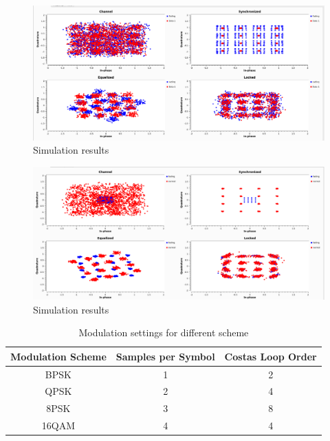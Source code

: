 \begin{figure}
	\includegraphics[width=\linewidth]{./figures/screenshots/QAM16_Fading_2.png}
	\caption{Simulation results}
	\label{fig:simul16QAM}	
\end{figure}

\begin{figure}
	\includegraphics[width=\linewidth]{./figures/screenshots/QAM16_Fading_2_.png}
	\caption{Simulation results}
	\label{fig:simul16QAM_1}	
\end{figure}

\begin{table}[]
	\centering
	\caption{Modulation settings for different scheme}
	\begin{tabular}{ccc}
		\toprule
		Modulation Scheme & Samples per Symbol & Costas Loop Order\\
		\midrule
		BPSK  & 1 & 2 \\
		QPSK  & 2 & 4 \\
		8PSK  & 3 & 8 \\
		16QAM & 4 & 4 \\
		\bottomrule
	\end{tabular}
	\label{tab:modulation_settings}
\end{table}

